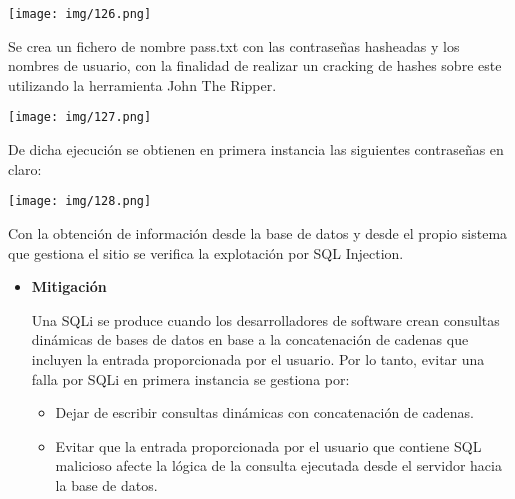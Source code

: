 \documentclass[12pt,oneside,a4paper]{book}
\begin{document}
\begin{enumerate}
\begin{center}
    \texttt{[image: img/126.png]}
\end{center}

\vspace{1em}

\hspace{20pt}
Se crea un fichero de nombre pass.txt con las contraseñas hasheadas y los nombres de usuario, con la finalidad de realizar un cracking de hashes sobre este utilizando la herramienta John The Ripper.

\vspace{1em}

\begin{center}
    \texttt{[image: img/127.png]}
\end{center}

\vspace{1em}

\hspace{20pt}
De dicha ejecución se obtienen en primera instancia las siguientes contraseñas en claro:

\vspace{1em}

\begin{center}
    \texttt{[image: img/128.png]}
\end{center}

\vspace{1em}

\hspace{20pt}
Con la obtención de información desde la base de datos y desde el propio sistema que gestiona el sitio se verifica la explotación por	 SQL Injection.

\vspace{2em}

\begin{itemize}
	\item 	\textbf{Mitigación}

\vspace{1em}

\hspace{20pt}
Una SQLi se produce cuando los desarrolladores de software crean consultas dinámicas de bases de datos en base a la concatenación de cadenas que incluyen la entrada proporcionada por el usuario. Por lo tanto, evitar una falla por SQLi en primera instancia se gestiona por:

\vspace{1em}

\begin{itemize}
\item Dejar de escribir consultas dinámicas con concatenación de cadenas.
\item Evitar que la entrada proporcionada por el usuario que contiene SQL malicioso afecte la lógica de la consulta ejecutada desde el servidor hacia la base de datos.
\end{itemize}


\end{itemize}
\end{enumerate}
\end{document}
